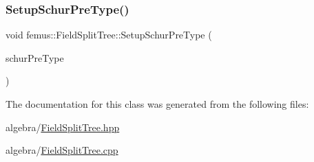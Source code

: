 \mbox{\label{classfemus_1_1_field_split_tree_ab5dcd3b572d392e04efb0f51d4296d1d}} 
\subsubsection{\texorpdfstring{Setup\+Schur\+Pre\+Type()}{SetupSchurPreType()}}
{\footnotesize\ttfamily void femus\+::\+Field\+Split\+Tree\+::\+Setup\+Schur\+Pre\+Type (\begin{DoxyParamCaption}\item[{const \mbox{\hyperlink{_schur_pre_type_8hpp_a45add9dd3b9c2331ba78b3f6c14ef459}{Schur\+Pre\+Type}} \&}]{schur\+Pre\+Type }\end{DoxyParamCaption})}



The documentation for this class was generated from the following files\+:\begin{DoxyCompactItemize}
\item 
algebra/\mbox{\hyperlink{_field_split_tree_8hpp}{Field\+Split\+Tree.\+hpp}}\item 
algebra/\mbox{\hyperlink{_field_split_tree_8cpp}{Field\+Split\+Tree.\+cpp}}\end{DoxyCompactItemize}

